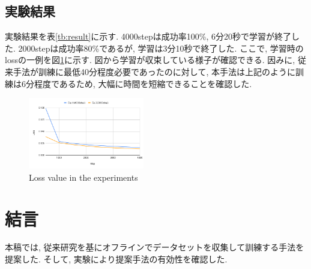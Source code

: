 \documentclass[10pt]{ujarticle}
\begin{document}
    \subsection{実験結果}実験結果を表\ref{tb:result}に示す. 4000stepは成功率100\%, 6分20秒で学習が終了した. 2000stepは成功率80\%であるが, 学習は3分10秒で終了した. ここで, 学習時のlossの一例を図\ref{Fig:loss}に示す. 図から学習が収束している様子が確認できる. 因みに, 従来手法が訓練に最低40分程度必要であったのに対して, 本手法は上記のように訓練は6分程度であるため, 大幅に時間を短縮できることを確認した. 

    \begin{table}[h]
        \caption{Number of successes in the experiment}
        \centering
        \label{tb:result}
      \end{table}

    \begin{figure}[h]
        \centering
        \includegraphics[width=0.45\textwidth]{fig/loss_compe.png}
        \caption{Loss value in the experiments}
        \label{Fig:loss}
    \end{figure}

    \section{結\hspace{2zw}言}%
    本稿では, 従来研究を基にオフラインでデータセットを収集して訓練する手法を提案した. そして, 実験により提案手法の有効性を確認した. 
\end{document}

